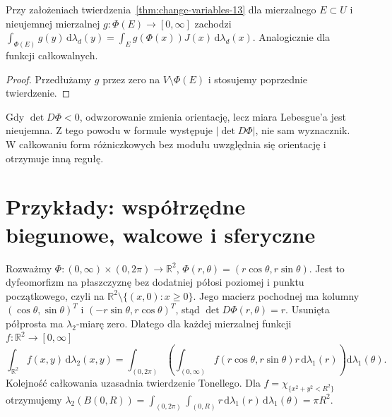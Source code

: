 \begin{wniosek}
\label{cor:change-subdomain-13}
Przy założeniach twierdzenia~\ref{thm:change-variables-13}
dla mierzalnego $E\subset U$ i nieujemnej
mierzalnej $g:\Phi(E)\to[0,\infty]$ zachodzi
$\int_{\Phi(E)}g(y)\,\mathrm d\lambda_d(y)
=\int_E g(\Phi(x))J(x)\,\mathrm d\lambda_d(x)$.
Analogicznie dla funkcji całkowalnych.
\end{wniosek}
\begin{proof}
Przedłużamy $g$ przez zero na $V\setminus\Phi(E)$
i stosujemy poprzednie twierdzenie.
\end{proof}

\begin{uwaga}
Gdy $\det D\Phi<0$, odwzorowanie zmienia orientację,
lecz miara Lebesgue'a jest nieujemna. Z tego powodu
w formule występuje $|\det D\Phi|$, nie sam wyznacznik.
W całkowaniu form różniczkowych bez modułu uwzględnia się
orientację i otrzymuje inną regułę.
\end{uwaga}

\section{Przykłady: współrzędne biegunowe, walcowe i sferyczne}

\begin{przyklad}
\label{ex:polar-13}
Rozważmy $\Phi:(0,\infty)\times(0,2\pi)\to\mathbb R^2$,
$\Phi(r,\theta)=(r\cos\theta,r\sin\theta)$.
Jest to dyfeomorfizm na płaszczyznę bez dodatniej
półosi poziomej i punktu początkowego, czyli na
$\mathbb R^2\setminus\{(x,0):x\ge0\}$.
Jego macierz pochodnej ma kolumny
$(\cos\theta,\sin\theta)^T$ i
$(-r\sin\theta,r\cos\theta)^T$, stąd
$\det D\Phi(r,\theta)=r$. Usunięta półprosta ma
$\lambda_2$-miarę zero. Dlatego dla każdej
mierzalnej funkcji $f:\mathbb R^2\to[0,\infty]$
\begin{equation}\label{eq:polar-13}
\int_{\mathbb R^2}f(x,y)\,\mathrm d\lambda_2(x,y)
=\int_{(0,2\pi)}\left(\int_{(0,\infty)}
 f(r\cos\theta,r\sin\theta)r\,\mathrm d\lambda_1(r)\right)
\mathrm d\lambda_1(\theta).
\end{equation}
Kolejność całkowania uzasadnia twierdzenie Tonellego.
Dla $f=\chi_{\{x^2+y^2<R^2\}}$ otrzymujemy
$\lambda_2(B(0,R))=\int_{(0,2\pi)}\int_{(0,R)}r\,
\mathrm d\lambda_1(r)\,\mathrm d\lambda_1(\theta)=\pi R^2$.
\end{przyklad}

